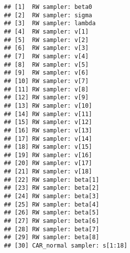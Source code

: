 \documentclass[]{article}
\newenvironment{Shaded}{\begin{snugshade}}{\end{snugshade}}
\newcommand{\CommentTok}[1]{\textcolor[rgb]{0.56,0.35,0.01}{\textit{#1}}}
\newcommand{\DataTypeTok}[1]{\textcolor[rgb]{0.13,0.29,0.53}{#1}}
\newcommand{\DecValTok}[1]{\textcolor[rgb]{0.00,0.00,0.81}{#1}}
\newcommand{\KeywordTok}[1]{\textcolor[rgb]{0.13,0.29,0.53}{\textbf{#1}}}
\newcommand{\NormalTok}[1]{#1}
\newcommand{\OperatorTok}[1]{\textcolor[rgb]{0.81,0.36,0.00}{\textbf{#1}}}
\newcommand{\StringTok}[1]{\textcolor[rgb]{0.31,0.60,0.02}{#1}}
\begin{document}
\begin{Shaded}
\end{Shaded}

\begin{verbatim}
## [1]  RW sampler: beta0
## [2]  RW sampler: sigma
## [3]  RW sampler: lambda
## [4]  RW sampler: v[1]
## [5]  RW sampler: v[2]
## [6]  RW sampler: v[3]
## [7]  RW sampler: v[4]
## [8]  RW sampler: v[5]
## [9]  RW sampler: v[6]
## [10] RW sampler: v[7]
## [11] RW sampler: v[8]
## [12] RW sampler: v[9]
## [13] RW sampler: v[10]
## [14] RW sampler: v[11]
## [15] RW sampler: v[12]
## [16] RW sampler: v[13]
## [17] RW sampler: v[14]
## [18] RW sampler: v[15]
## [19] RW sampler: v[16]
## [20] RW sampler: v[17]
## [21] RW sampler: v[18]
## [22] RW sampler: beta[1]
## [23] RW sampler: beta[2]
## [24] RW sampler: beta[3]
## [25] RW sampler: beta[4]
## [26] RW sampler: beta[5]
## [27] RW sampler: beta[6]
## [28] RW sampler: beta[7]
## [29] RW sampler: beta[8]
## [30] CAR_normal sampler: s[1:18]
\end{verbatim}
\end{document}
